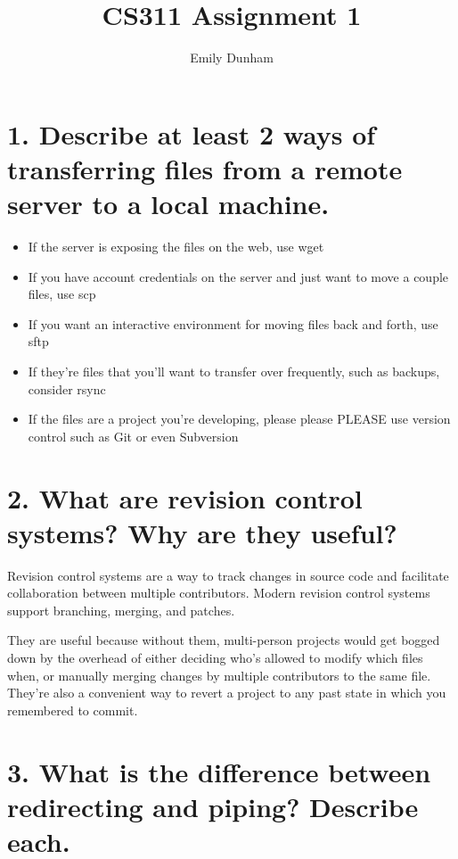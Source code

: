 \documentclass[10pt]{article}
\title{CS311 Assignment 1}
\author{Emily Dunham}
\date{}
\begin{document}
\maketitle

\section{1. Describe at least 2 ways of transferring files from a remote
server to a local machine.} 

\begin{itemize}

\item If the server is exposing the files on the web, use wget

\item If you have account credentials on the server and just want to move a
couple files, use scp

\item If you want an interactive environment for moving files back and forth,
use sftp

\item If they're files that you'll want to transfer over frequently, such as
backups, consider rsync

\item If the files are a project you're developing, please please PLEASE use
version control such as Git or even Subversion

\end{itemize}

\section{2. What are revision control systems? Why are they useful?}

Revision control systems are a way to track changes in source code and
facilitate collaboration between multiple contributors. Modern revision
control systems support branching, merging, and patches. 

They are useful because without them, multi-person projects would get bogged
down by the overhead of either deciding who's allowed to modify which files
when, or manually merging changes by multiple contributors to the same file.
They're also a convenient way to revert a project to any past state in which
you remembered to commit.

\section{3. What is the difference between redirecting and piping? Describe each.}
\end{document}
